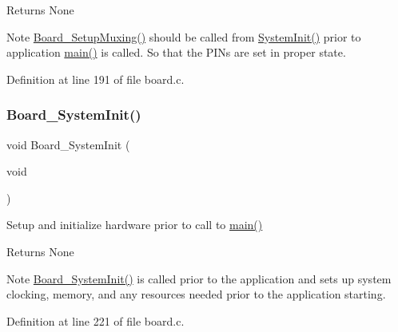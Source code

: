 \begin{DoxyReturn}{Returns}
None 
\end{DoxyReturn}
\begin{DoxyNote}{Note}
\hyperlink{group___b_o_a_r_d___c_o_m_m_o_n___a_p_i_ga8ac1dc465c66e1cc00f5ffd346904d97}{Board\+\_\+\+Setup\+Muxing()} should be called from \hyperlink{armv7m__startup_8c_a93f514700ccf00d08dbdcff7f1224eb2}{System\+Init()} prior to application \hyperlink{group__samples_ga840291bc02cba5474a4cb46a9b9566fe}{main()} is called. So that the P\+I\+Ns are set in proper state. 
\end{DoxyNote}


Definition at line 191 of file board.\+c.

\mbox{\label{group__hal_gaeb60ea85499a4208167ae2540086516a}} 
\subsubsection{\texorpdfstring{Board\+\_\+\+System\+Init()}{Board\_SystemInit()}}
{\footnotesize\ttfamily void Board\+\_\+\+System\+Init (\begin{DoxyParamCaption}\item[{void}]{ }\end{DoxyParamCaption})}



Setup and initialize hardware prior to call to \hyperlink{group__samples_ga840291bc02cba5474a4cb46a9b9566fe}{main()} 

\begin{DoxyReturn}{Returns}
None 
\end{DoxyReturn}
\begin{DoxyNote}{Note}
\hyperlink{group___b_o_a_r_d___c_o_m_m_o_n___a_p_i_gaeb60ea85499a4208167ae2540086516a}{Board\+\_\+\+System\+Init()} is called prior to the application and sets up system clocking, memory, and any resources needed prior to the application starting. 
\end{DoxyNote}


Definition at line 221 of file board.\+c.

\mbox{\label{group__hal_ga872de86244ed2e3b86c2bf26b9c64733}} 
